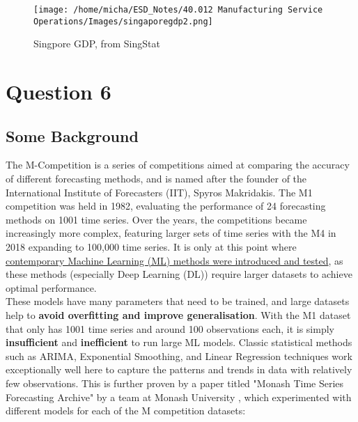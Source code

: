 \documentclass[12pt]{article}
\begin{document}
\begin{figure}[H]
    \centering
    \texttt{[image: /home/micha/ESD\_Notes/40.012 Manufacturing Service Operations/Images/singaporegdp2.png]}
    \caption{Singpore GDP, from SingStat}
    \label{fig:5-sggdp2}
\end{figure} 

\newpage 

\section*{Question 6}





\subsection*{Some Background}

The M-Competition is a series of competitions aimed at comparing the accuracy of different forecasting methods, and is named after the founder of the International Institute of Forecasters (IIT), Spyros Makridakis. The M1 competition was held in 1982, evaluating the performance of 24 forecasting methods on 1001 time series. Over the years, the competitions became increasingly more complex, featuring larger sets of time series with the M4 in 2018 expanding to 100,000 time series. It is only at this point where \href{https://www.unic.ac.cy/iff/research/forecasting/m-competitions/m5/}{contemporary Machine Learning (ML) methods were introduced and tested}, as these methods (especially Deep Learning (DL)) require larger datasets to achieve optimal performance. \\ 

\noindent These models have many parameters that need to be trained, and large datasets help to \textbf{avoid overfitting and improve generalisation}. With the M1 dataset that only has 1001 time series and around 100 observations each, it is simply \textbf{insufficient} and \textbf{inefficient} to run large ML models. Classic statistical methods such as ARIMA, Exponential Smoothing, and Linear Regression techniques work exceptionally well here to capture the patterns and trends in data with relatively few observations. This is further proven by a paper titled "Monash Time Series Forecasting Archive" by a team at Monash University \cite{godahewa2021monash}, which experimented with different models for each of the M competition datasets: 
\end{document}
